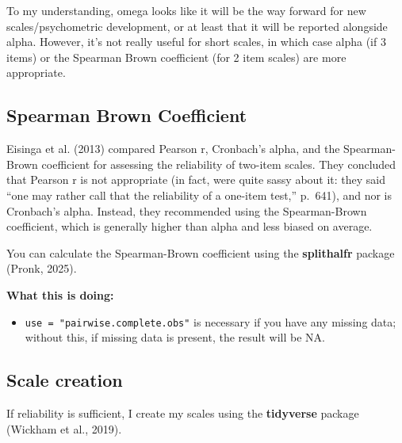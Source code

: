 \documentclass[
  letterpaper,
  DIV=11,
  numbers=noendperiod]{scrreprt}
\newenvironment{Shaded}{\begin{snugshade}}{\end{snugshade}}
\newcommand{\AttributeTok}[1]{\textcolor[rgb]{0.40,0.45,0.13}{#1}}
\newcommand{\FunctionTok}[1]{\textcolor[rgb]{0.28,0.35,0.67}{#1}}
\newcommand{\NormalTok}[1]{\textcolor[rgb]{0.00,0.23,0.31}{#1}}
\newcommand{\SpecialCharTok}[1]{\textcolor[rgb]{0.37,0.37,0.37}{#1}}
\newcommand{\StringTok}[1]{\textcolor[rgb]{0.13,0.47,0.30}{#1}}
\providecommand{\tightlist}{%
  \setlength{\itemsep}{0pt}\setlength{\parskip}{0pt}}\usepackage{longtable,booktabs,array}
\begin{document}
To my understanding, omega looks like it will be the way forward for new
scales/psychometric development, or at least that it will be reported
alongside alpha. However, it's not really useful for short scales, in
which case alpha (if 3 items) or the Spearman Brown coefficient (for 2
item scales) are more appropriate.

\subsection{Spearman Brown
Coefficient}\label{spearman-brown-coefficient}

Eisinga et al. (2013) compared Pearson r, Cronbach's alpha, and the
Spearman-Brown coefficient for assessing the reliability of two-item
scales. They concluded that Pearson r is not appropriate (in fact, were
quite sassy about it: they said ``one may rather call that the
reliability of a one-item test,'' p.~641), and nor is Cronbach's alpha.
Instead, they recommended using the Spearman-Brown coefficient, which is
generally higher than alpha and less biased on average.

You can calculate the Spearman-Brown coefficient using the
\textbf{splithalfr} package (Pronk, 2025).

\begin{Shaded}
\end{Shaded}

\textbf{What this is doing:}

\begin{itemize}
\tightlist
\item
  \texttt{use\ =\ "pairwise.complete.obs"} is necessary if you have any
  missing data; without this, if missing data is present, the result
  will be NA.
\end{itemize}

\subsection{Scale creation}\label{scale-creation}

If reliability is sufficient, I create my scales using the
\textbf{tidyverse} package (Wickham et al., 2019).
\end{document}
